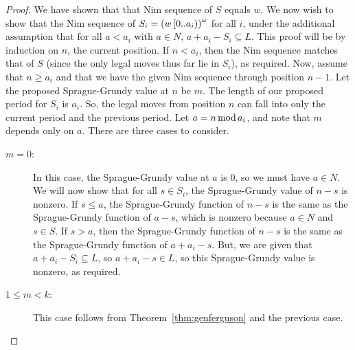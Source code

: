 \documentclass[english,12pt]{article}
\begin{document}
\begin{proof}
We have shown that that Nim sequence of $S$ equals $w$.  We now wish to show that the Nim sequence of $S_i=\left(w\left[0..a_i\right)\right)^\omega$ for all $i$, under the additional assumption that for all $a<a_i$ with $a\in N$, $a+a_i-S_i\subseteq L$.
This proof will be by induction on $n$, the current position.
If $n<a_i$, then the Nim sequence matches that of $S$ (since the only legal moves thus far lie in $S_i$), as required.  Now, assume that $n\geq a_i$ and that we have the given Nim sequence through position $n-1$.  Let the proposed Sprague-Grundy value at $n$ be $m$.  The length of our proposed period for $S_i$ is $a_i$.  So, the legal moves from position $n$ can fall into only the current period and the previous period.  Let $a=n\operatorname{mod} a_i$, and note that $m$ depends only on $a$.
There are three cases to consider.
\begin{description}
\item[$m=0$:] In this case, the Sprague-Grundy value at $a$ is $0$, so we must have $a\in N$.  We will now show that for all $s\in S_i$, the Sprague-Grundy value of $n-s$ is nonzero.  If $s\leq a$, the Sprague-Grundy function of $n-s$ is the same as the Sprague-Grundy function of $a-s$, which is nonzero because $a\in N$ and $s\in S$.  If $s>a$, then the Sprague-Grundy function of $n-s$ is the same as the Sprague-Grundy function of $a+a_i-s$.
But, we are given that $a+a_i-S_i\subseteq L$, so $a+a_i-s\in L$, so this Sprague-Grundy value is nonzero, as required.
\item[$1\leq m<k$:] This case follows from Theorem~\ref{thm:genferguson} and the previous case.

\end{description}
\end{proof}
\end{document}
